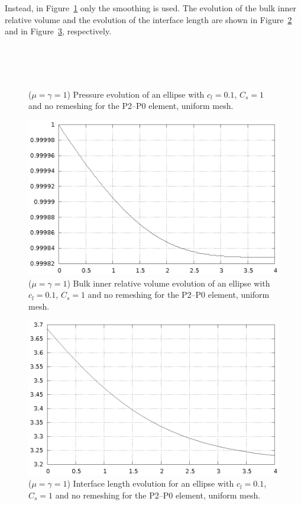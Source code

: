 \documentclass[a4paper,12pt,onecolumn]{article}
\begin{document}
Instead, in Figure~\ref{fig:ellipse_smooth} only the smoothing is used. The evolution of the bulk inner relative volume and the evolution of the interface length are shown in Figure~\ref{fig:ellipse_smooth_bulk_inner_volume} and in Figure~\ref{fig:ellipse_smooth_interface_length}, respectively.
\begin{figure}[htbp]
  \centering
  \\
  \quad
  \\
  \quad
  \\
  \caption{($\mu=\gamma=1$) Pressure evolution of an ellipse with $c_l=0.1$, $C_s=1$ and no remeshing for the P2--P0 element, uniform mesh.}
  \label{fig:ellipse_smooth}
\end{figure}

\begin{figure}[htbp]
  \centering
  \includegraphics[width=.45\textwidth]{images/ellipse_smooth_bulk_inner_volume.ps}
  \caption{($\mu=\gamma=1$) Bulk inner relative volume evolution of an ellipse with $c_l=0.1$, $C_s=1$ and no remeshing for the P2--P0 element, uniform mesh.}
  \label{fig:ellipse_smooth_bulk_inner_volume}
\end{figure}

\begin{figure}[htbp]
  \centering
  \includegraphics[width=.45\textwidth]{images/ellipse_smooth_interface_length.ps}
  \caption{($\mu=\gamma=1$) Interface length evolution for an ellipse with $c_l=0.1$, $C_s=1$ and no remeshing for the P2--P0 element, uniform mesh.}
  \label{fig:ellipse_smooth_interface_length}
\end{figure}
\end{document}
